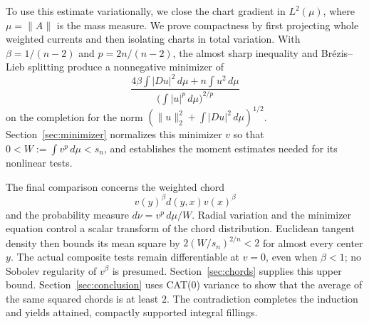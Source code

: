 To use this estimate variationally, we close the chart gradient in
$L^2(\mu)$, where $\mu=\|A\|$ is the mass measure. We prove compactness
by first projecting whole weighted currents and then isolating charts
in total variation. With $\beta=1/(n-2)$ and $p=2n/(n-2)$, the
almost sharp inequality and Br\'ezis--Lieb splitting
\cite{BrezisLieb1983} produce a nonnegative minimizer of
\[
 \frac{4\beta\int |Du|^2\,d\mu+n\int u^2\,d\mu}
 {\bigl(\int |u|^p\,d\mu\bigr)^{2/p}}
\]
on the completion for the norm
$(\|u\|_2^2+\int|Du|^2\,d\mu)^{1/2}$. Section~\ref{sec:minimizer} normalizes this
minimizer $v$ so that $0<W:=\int v^p\,d\mu<s_n$, and establishes
the moment estimates needed for its nonlinear tests.

The final comparison concerns the weighted chord
\[
 v(y)^\beta d(y,x)v(x)^\beta
\]
and the probability measure $d\nu=v^p\,d\mu/W$.
Radial variation and the minimizer equation control a scalar transform
of the chord distribution. Euclidean tangent density then bounds its
mean square by $2(W/s_n)^{2/n}<2$ for almost every center $y$.
The actual composite tests remain differentiable at $v=0$, even when
$\beta<1$; no Sobolev regularity of $v^\beta$ is presumed.
Section~\ref{sec:chords} supplies this upper bound.
Section~\ref{sec:conclusion} uses CAT(0) variance to show that the
average of the same squared chords is at least $2$. The contradiction
completes the induction and yields attained, compactly supported
integral fillings.

